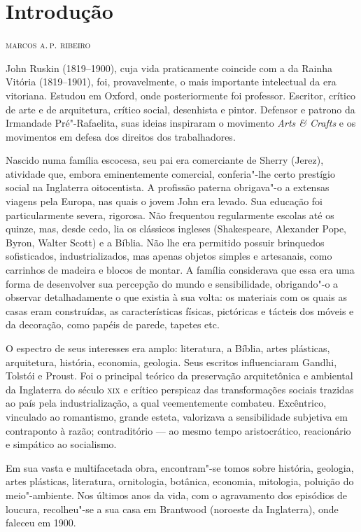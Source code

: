 \chapter{Introdução}

\begin{flushright}
\textsc{marcos a.\,p. ribeiro}
\end{flushright}\medskip

\noindent{}John Ruskin (1819--1900), cuja vida praticamente coincide com a da Rainha
Vitória (1819--1901), foi, provavelmente, o mais importante intelectual da
era vitoriana. Estudou em Oxford, onde posteriormente foi professor.
Escritor, crítico de arte e de arquitetura, crítico social, desenhista e
pintor. Defensor e patrono da Irmandade Pré"-Rafaelita, suas ideias
inspiraram o movimento \emph{Arts \& Crafts} e os movimentos em defesa
dos direitos dos trabalhadores.

Nascido numa família escocesa, seu pai era comerciante de Sherry
(Jerez), atividade que, embora eminentemente comercial, conferia"-lhe
certo prestígio social na Inglaterra oitocentista. A profissão paterna
obrigava"-o a extensas viagens pela Europa, nas quais o jovem John era
levado. Sua educação foi particularmente severa, rigorosa. Não
frequentou regularmente escolas até os quinze, mas, desde cedo, lia os
clássicos ingleses (Shakespeare, Alexander Pope, Byron, Walter Scott) e
a Bíblia. Não lhe era permitido possuir brinquedos sofisticados,
industrializados, mas apenas objetos simples e artesanais, como
carrinhos de madeira e blocos de montar. A família considerava que essa
era uma forma de desenvolver sua percepção do mundo e sensibilidade,
obrigando"-o a observar detalhadamente o que existia à sua volta: os
materiais com os quais as casas eram construídas, as características
físicas, pictóricas e tácteis dos móveis e da decoração, como papéis de
parede, tapetes etc.

O espectro de seus interesses era amplo: literatura, a Bíblia, artes
plásticas, arquitetura, história, economia, geologia. Seus escritos
influenciaram Gandhi, Tolstói e Proust. Foi o principal teórico da
preservação arquitetônica e ambiental da Inglaterra do século \textsc{xix} e
crítico perspicaz das transformações sociais trazidas ao país pela
industrialização, a qual veementemente combateu. Excêntrico, vinculado
ao romantismo, grande esteta, valorizava a sensibilidade subjetiva em
contraponto à razão; contraditório --- ao mesmo tempo aristocrático,
reacionário e simpático ao socialismo.

Em sua vasta e multifacetada obra, encontram"-se tomos sobre história,
geologia, artes plásticas, literatura, ornitologia, botânica, economia,
mitologia, poluição do meio"-ambiente. Nos últimos anos da vida, com o
agravamento dos episódios de loucura, recolheu"-se a sua casa em
Brantwood (noroeste da Inglaterra), onde faleceu em 1900.

